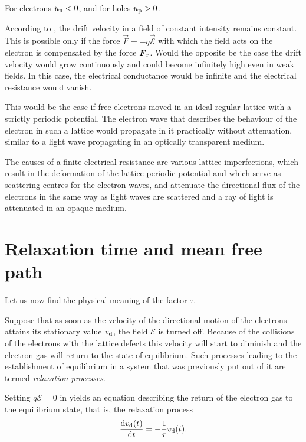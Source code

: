 \noindent
For electrons $u_{\text{n}}<0$, and for holes $u_{\text{p}}>0$.

According to , the drift velocity in a field of constant intensity remains constant. This is possible only if the force $\vec{F}=-q\vec{\mathcal{E}}$ with which the field acts on the electron is compensated by the force $\boldsymbol{F}_{\text{r}}$. Would the opposite be the case the drift velocity would grow continuously and could become infinitely high even in weak fields. In this case, the electrical conductance would be infinite and the electrical resistance would vanish.

This would be the case if free electrons moved in an ideal regular lattice with a strictly periodic potential. The electron wave that describes the behaviour of the electron in such a lattice would propagate in it practically without attenuation, similar to a light wave propagating in an optically transparent medium.

The causes of a finite electrical resistance are various lattice imperfections, which result in the deformation of the lattice periodic potential and which serve as scattering centres for the electron waves, and attenuate the directional flux of the electrons in the same way as light waves are scattered and a ray of light is attenuated in an opaque medium.

\section{Relaxation time and mean free path}\label{sec:49}

Let us now find the physical meaning of the factor $\tau$.

Suppose that as soon as the velocity of the directional motion of the electrons attains its stationary value $v_{\text{d}}$, the field $\mathcal{E}$ is turned off. Because of the collisions of the electrons with the lattice defects this velocity will start to diminish and the electron gas will return to the state of equilibrium. Such processes leading to the establishment
of equilibrium in a system that was previously put out of it are termed \textit{relaxation processes}.

Setting $q\mathcal{E}=0$ in  yields an equation describing the return of the electron gas to the equilibrium state, that is, the relaxation process
\begin{equation}\label{eq:6_6}
    \dfrac{\mathrm{d}v_{\text{d}}(t)}{\mathrm{d} t} = - \frac{1}{\tau} v_{\text{d}}(t).
\end{equation}

